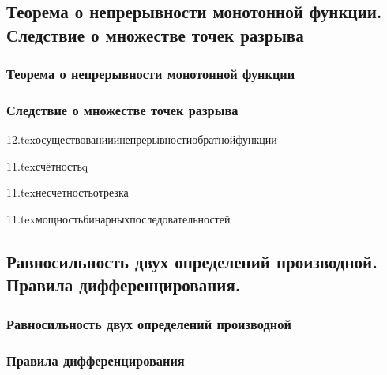 \subsection{\teormin Теорема о непрерывности монотонной функции. Следствие о множестве точек разрыва}
\subsubsection{Теорема о непрерывности монотонной функции}
\subsubsection{Следствие о множестве точек разрыва}

{12.tex}{осуществованииинепрерывностиобратнойфункции}

{11.tex}{счётностьq}

{11.tex}{несчетностьотрезка}

{11.tex}{мощностьбинарныхпоследовательностей}

\subsection{Равносильность двух определений производной. Правила дифференцирования.}
\subsubsection{Равносильность двух определений производной}
\subsubsection{Правила дифференцирования}

